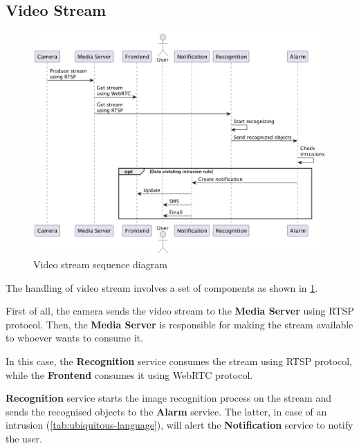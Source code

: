 \documentclass{scrartcl}
\begin{document}
    \subsection{Video Stream}
    \begin{figure}
        \centering
        \includegraphics[scale=0.5]{img/video-stream-sequence}
        \caption{Video stream sequence diagram}
        \label{fig:video-stream-sequence}
    \end{figure}

    The handling of video stream involves a set of components as shown in \cref{fig:video-stream-sequence}.

    First of all, the camera sends the video stream to the \textbf{Media Server} using RTSP protocol.
    Then, the \textbf{Media Server} is responsible for making the stream available to whoever wants to consume it.

    In this case, the  \textbf{Recognition} service consumes the stream using RTSP protocol, while the \textbf{Frontend} consumes it using WebRTC protocol.

    \textbf{Recognition} service starts the image recognition process on the stream and sends the recognised objects to the \textbf{Alarm} service.
    The latter, in case of an intrusion (\cref{tab:ubiquitous-language}), will alert the  \textbf{Notification} service to notify the user.
\end{document}
